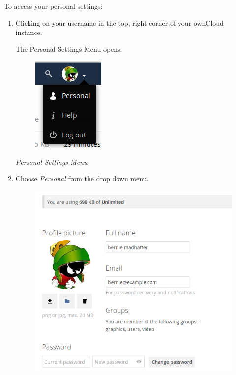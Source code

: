 \documentclass[letterpaper,10pt,english]{sphinxmanual}
\begin{document}
To access your personal settings:
\begin{enumerate}
\item {} 
Clicking on your username in the top, right corner of your ownCloud instance.

The Personal Settings Menu opens.
\begin{figure}[htbp]
\centering

\includegraphics{oc_personal_settings_dropdown.png}
\end{figure}

\emph{Personal Settings Menu}

\item {} 
Choose \emph{Personal} from the drop down menu.
\begin{figure}[htbp]
\centering

\includegraphics{personal_settings.png}
\end{figure}

\end{enumerate}
\end{document}
